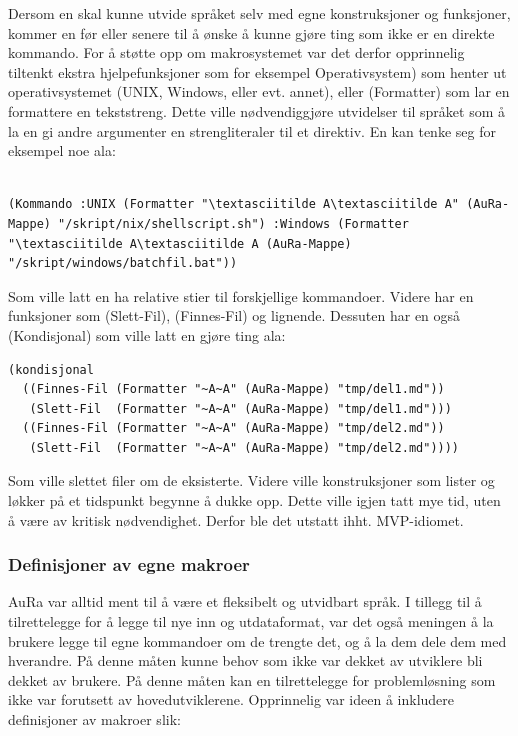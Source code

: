 \documentclass[norsk, 11pt, a4paper]{article}
\begin{document}
Dersom en skal kunne utvide språket selv med egne konstruksjoner og funksjoner, kommer en før eller senere til å ønske å kunne gjøre ting som ikke er en direkte kommando.
For å støtte opp om makrosystemet var det derfor opprinnelig tiltenkt ekstra hjelpefunksjoner som for eksempel  Operativsystem) som henter ut operativsystemet (UNIX, Windows, eller evt. annet), eller (Formatter) som lar en formattere en tekststreng.
Dette ville nødvendiggjøre utvidelser til språket som å la en gi andre argumenter en strengliteraler til et direktiv.
En kan tenke seg for eksempel noe ala:




\begin{lstlisting}

(Kommando :UNIX (Formatter "\textasciitilde A\textasciitilde A" (AuRa-Mappe) "/skript/nix/shellscript.sh") :Windows (Formatter "\textasciitilde A\textasciitilde A (AuRa-Mappe) "/skript/windows/batchfil.bat"))
\end{lstlisting}




Som ville latt en ha relative stier til forskjellige kommandoer. Videre har en funksjoner som (Slett-Fil), (Finnes-Fil) og lignende. Dessuten har en også (Kondisjonal) som ville latt en gjøre ting ala:


\begin{lstlisting}
(kondisjonal
  ((Finnes-Fil (Formatter "~A~A" (AuRa-Mappe) "tmp/del1.md"))
   (Slett-Fil  (Formatter "~A~A" (AuRa-Mappe) "tmp/del1.md")))
  ((Finnes-Fil (Formatter "~A~A" (AuRa-Mappe) "tmp/del2.md"))
   (Slett-Fil  (Formatter "~A~A" (AuRa-Mappe) "tmp/del2.md"))))
\end{lstlisting}

Som ville slettet filer om de eksisterte. Videre ville konstruksjoner som lister og løkker på et tidspunkt begynne å dukke opp. Dette ville igjen tatt mye tid, uten å være av kritisk nødvendighet. Derfor ble det utstatt ihht. MVP-idiomet.

\subsubsection{Definisjoner av egne makroer}

AuRa var alltid ment til å være et fleksibelt og utvidbart språk. I tillegg til å tilrettelegge for å legge til nye inn og utdataformat, var det også meningen å la brukere legge til egne kommandoer om de trengte det, og å la dem dele dem med hverandre.
På denne måten kunne behov som ikke var dekket av utviklere bli dekket av brukere. På denne måten kan en tilrettelegge for problemløsning som ikke var forutsett av hovedutviklerene. Opprinnelig var ideen å inkludere definisjoner av makroer slik:
\end{document}

